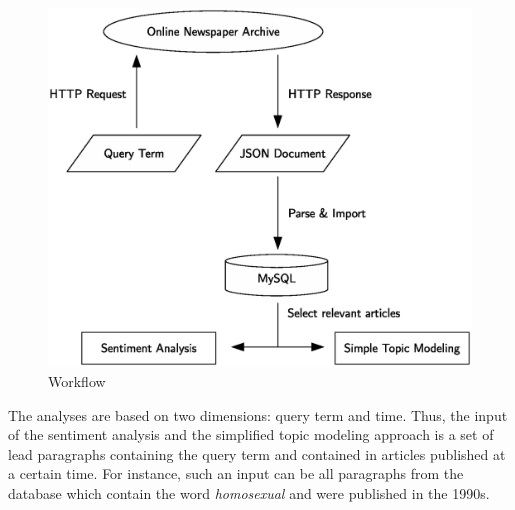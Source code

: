 \documentclass[10pt,a4paper,twocolumn]{scrartcl}
\begin{document}
\begin{figure}
\includegraphics[width=\columnwidth]{figures/workflow_eps}
\caption{Workflow} \label{fig:workflow}
\end{figure}

The analyses are based on two dimensions: query term and time. Thus, the input of the sentiment analysis and the simplified topic modeling approach is a set of lead paragraphs containing the query term and contained in articles published at a certain time. For instance, such an input can be all paragraphs from the database which contain the word \textit{homosexual} and were published in the 1990s.
\end{document}
